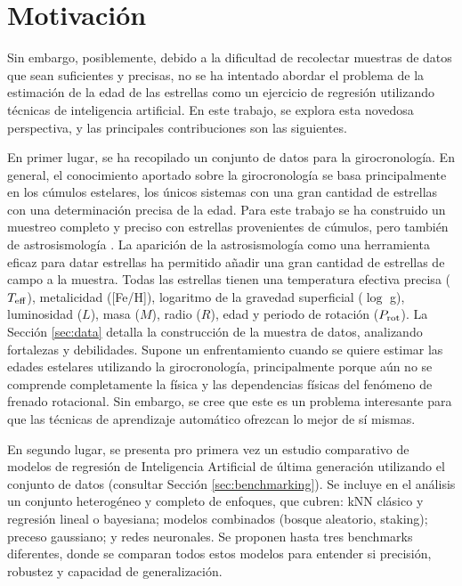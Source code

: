 \section{Motivación}

Sin embargo, posiblemente, debido a la dificultad de recolectar muestras de datos que sean suficientes y precisas, no se ha intentado abordar el problema de la estimación de la edad de las estrellas como un ejercicio de regresión utilizando técnicas de inteligencia artificial. En este trabajo, se explora esta novedosa perspectiva, y las principales contribuciones son las siguientes.

En primer lugar, se ha recopilado un conjunto de datos para la girocronología. En general, el conocimiento aportado sobre la girocronología se basa principalmente en los cúmulos estelares, los únicos sistemas con una gran cantidad de estrellas con una determinación precisa de la edad. Para este trabajo se ha construido un muestreo completo y preciso con estrellas provenientes de cúmulos, pero también de astrosismología \cite{Angus15, Metcalfe19, Saders16}. La aparición de la astrosismología como una herramienta eficaz para datar estrellas ha permitido añadir una gran cantidad de estrellas de campo a la muestra. Todas las estrellas tienen una temperatura efectiva precisa ($T_{\rm eff}$), metalicidad ([Fe/H]), logaritmo de la gravedad superficial ($\log$ g), luminosidad ($L$), masa ($M$), radio ($R$), edad y periodo de rotación ($P_{\rm rot}$). La Sección \ref{sec:data} detalla la construcción de la muestra de datos, analizando fortalezas y debilidades. Supone un enfrentamiento cuando se quiere estimar las edades estelares utilizando la girocronología, principalmente porque aún no se comprende completamente la física y las dependencias físicas del fenómeno de frenado rotacional. Sin embargo, se cree que este es un problema interesante para que las técnicas de aprendizaje automático ofrezcan lo mejor de sí mismas.

En segundo lugar, se presenta pro primera vez un estudio comparativo de modelos de regresión de Inteligencia Artificial de última generación utilizando el conjunto de datos (consultar Sección \ref{sec:benchmarking}). Se incluye en el análisis un conjunto heterogéneo y completo de enfoques, que cubren: kNN clásico y regresión lineal o bayesiana; modelos combinados (bosque aleatorio, staking); preceso gaussiano; y redes neuronales. Se proponen hasta tres benchmarks diferentes, donde se comparan todos estos modelos para entender si precisión, robustez y capacidad de generalización.

